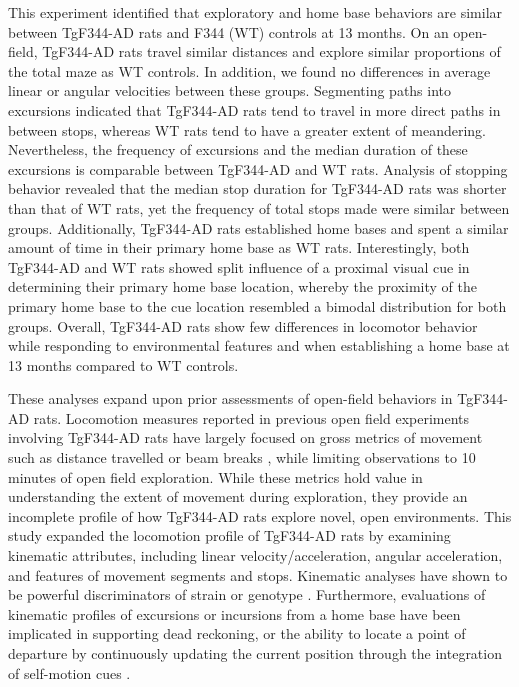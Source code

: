 \documentclass[fleqn,10pt]{wlscirep}
\begin{document}
This experiment identified that exploratory and home base behaviors are similar between TgF344-AD rats and F344 (WT) controls at 13 months. On an open-field, TgF344-AD rats travel similar distances and explore similar proportions of the total maze as WT controls. In addition, we found no differences in average linear or angular velocities between these groups. Segmenting paths into excursions indicated that TgF344-AD rats tend to travel in more direct paths in between stops, whereas WT rats tend to have a greater extent of meandering. Nevertheless, the frequency of excursions and the median duration of these excursions is comparable between TgF344-AD and WT rats. Analysis of stopping behavior revealed that the median stop duration for TgF344-AD rats was shorter than that of WT rats, yet the frequency of total stops made were similar between groups. Additionally, TgF344-AD rats established home bases and spent a similar amount of time in their primary home base as WT rats. Interestingly, both TgF344-AD and WT rats showed split influence of a proximal visual cue in determining their primary home base location, whereby the proximity of the primary home base to the cue location resembled a bimodal distribution for both groups. Overall, TgF344-AD rats show few differences in locomotor behavior while responding to environmental features and when establishing a home base at 13 months compared to WT controls. 


These analyses expand upon prior assessments of open-field behaviors in TgF344-AD rats. Locomotion measures reported in previous open field experiments involving TgF344-AD rats have largely focused on gross metrics of movement such as distance travelled \cite{morrone_regional_2020,voorhees_occupational-like_2019,voorhees_-p7c3-s243_2018} or beam breaks \cite{cohen_transgenic_2013}, while limiting observations to 10 minutes of open field exploration. While these metrics hold value in understanding the extent of movement during exploration, they provide an incomplete profile of how TgF344-AD rats explore novel, open environments. This study expanded the locomotion profile of TgF344-AD rats by examining kinematic attributes, including linear velocity/acceleration, angular acceleration, and features of movement segments and stops. Kinematic analyses have shown to be powerful discriminators of strain or genotype \cite{benjamini_ten_2010}. Furthermore, evaluations of kinematic profiles of excursions or incursions from a home base have been implicated in supporting dead reckoning, or the ability to locate a point of departure by continuously updating the current position through the integration of self-motion cues \cite{wallace_fractionating_2008,wallace_movement_2006,wallace_quantification_2002}.
\end{document}
